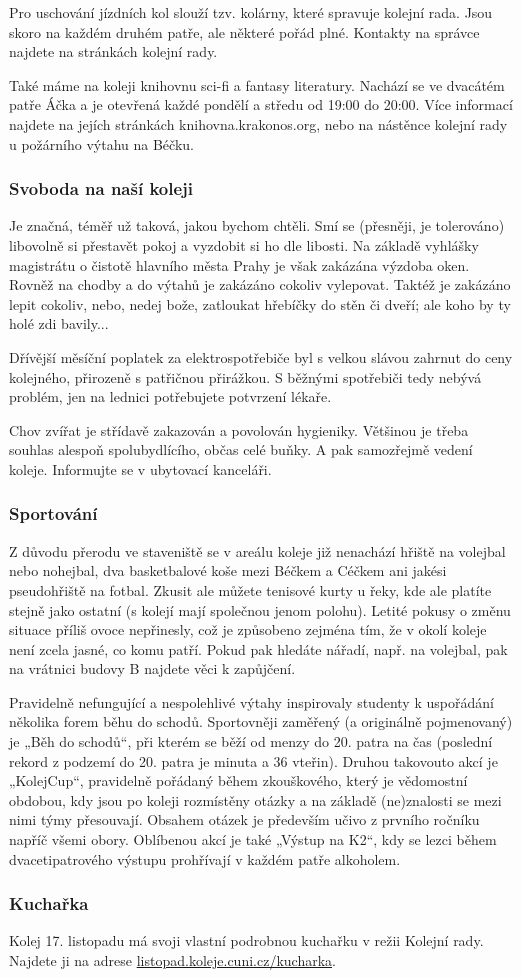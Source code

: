 Pro uschování jízdních kol slouží tzv. kolárny, které spravuje kolejní rada.
Jsou skoro na každém druhém patře, ale některé pořád plné. Kontakty na správce
najdete na stránkách kolejní rady.

Také máme na koleji knihovnu sci-fi a fantasy literatury. Nachází se ve dvacátém
patře Áčka a je otevřená každé pondělí a středu od 19:00 do 20:00. Více
informací najdete na jejích stránkách knihovna.krakonos.org, nebo na nástěnce
kolejní rady u požárního výtahu na Béčku.


\subsubsection{Svoboda na naší koleji}
Je značná, téměř už taková, jakou bychom chtěli. Smí se (přesněji, je
tolerováno) libovolně si přestavět pokoj a vyzdobit si ho dle libosti. Na
základě vyhlášky magistrátu o čistotě hlavního města Prahy je však zakázána
výzdoba oken. Rovněž na chodby a do výtahů je zakázáno cokoliv vylepovat. Taktéž
je zakázáno lepit cokoliv, nebo, nedej bože, zatloukat hřebíčky do stěn či
dveří; ale koho by ty holé zdi bavily...

Dřívější měsíční poplatek za elektrospotřebiče byl s velkou slávou zahrnut do
ceny kolejného, přirozeně s patřičnou přirážkou. S běžnými spotřebiči tedy
nebývá problém, jen na lednici potřebujete potvrzení lékaře.

Chov zvířat je střídavě zakazován a povolován hygieniky. Většinou je třeba
souhlas alespoň spolubydlícího, občas celé buňky. A pak samozřejmě vedení
koleje. Informujte se v ubytovací kanceláři.


\subsubsection{Sportování}
Z důvodu přerodu ve staveniště se v areálu koleje již nenachází hřiště na
volejbal nebo nohejbal, dva basketbalové koše mezi Béčkem a Céčkem ani jakési
pseudohřiště na fotbal. Zkusit ale můžete tenisové kurty u řeky, kde ale platíte
stejně jako ostatní (s kolejí mají společnou jenom polohu). Letité pokusy o
změnu situace příliš ovoce nepřinesly, což je způsobeno zejména tím, že v okolí
koleje není zcela jasné, co komu patří. Pokud pak hledáte nářadí, např. na
volejbal, pak na vrátnici budovy B najdete věci k zapůjčení.

Pravidelně nefungující a nespolehlivé výtahy inspirovaly studenty k uspořádání
několika forem běhu do schodů. Sportovněji zaměřený (a originálně pojmenovaný)
je „Běh do schodů“, při kterém se běží od menzy do 20. patra na čas (poslední
rekord z podzemí do 20. patra je minuta a 36 vteřin). Druhou takovouto akcí je
„KolejCup“, pravidelně pořádaný během zkouškového, který je vědomostní obdobou,
kdy jsou po koleji rozmístěny otázky a na základě (ne)znalosti se mezi nimi týmy
přesouvají. Obsahem otázek je především učivo z prvního ročníku napříč všemi
obory. Oblíbenou akcí je také „Výstup na K2“, kdy se lezci během
dvacetipatrového výstupu prohřívají v každém patře alkoholem.


\subsubsection{Kuchařka}
Kolej 17. listopadu má svoji vlastní podrobnou kuchařku v režii Kolejní rady.
Najdete ji na adrese \url{listopad.koleje.cuni.cz/kucharka}.